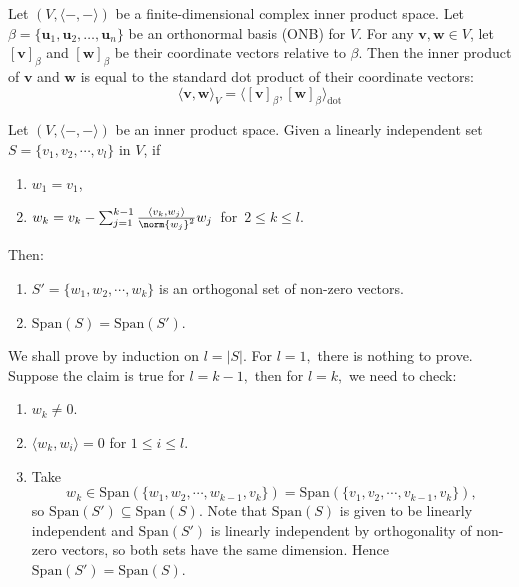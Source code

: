 \begin{theorem}
    Let $(V,\langle-,-\rangle)$ be a finite-dimensional complex inner product space. Let $\beta = \{\mathbf{u}_1, \mathbf{u}_2, \dots, \mathbf{u}_n\}$ be an orthonormal basis (ONB) for $V$. For any $\mathbf{v}, \mathbf{w} \in V$, let $[\mathbf{v}]_\beta$ and $[\mathbf{w}]_\beta$ be their coordinate vectors relative to $\beta$. Then the inner product of $\mathbf{v}$ and $\mathbf{w}$ is equal to the standard dot product of their coordinate vectors:
    $$ \langle \mathbf{v}, \mathbf{w} \rangle_V = \langle [\mathbf{v}]_\beta, [\mathbf{w}]_\beta \rangle_{\mathrm{dot}} $$
    \label{coordinate dot product}
\end{theorem}

\begin{theorem}
    Let $(V,\langle-,-\rangle)$ be an inner product space. Given a linearly independent set $S=\{v_1,v_2,\cdots,v_l\}$ in $V$, if
    \begin{enumerate}
        \item $w_1=v_1$,
        \item $w_k=v_k-\sum_{j=1}^{k-1}\frac{\langle v_k, w_j\rangle}{\norm{w_j}^2}w_j\,$ for $\,2\le k\le l.$
    \end{enumerate} 
    Then:
    \begin{enumerate}
        \item $S'=\{w_1,w_2,\cdots,w_k\}$ is an orthogonal set of non-zero vectors.
        \item $\mathrm{Span}(S)=\mathrm{Span}(S').$
    \end{enumerate}
\end{theorem}

\begin{pfbox}
    We shall prove by induction on $l=|S|.$
    For $l=1,$ there is nothing to prove. Suppose the claim is true for $l=k-1,$ then for $l=k,$
    we need to check:
    \begin{enumerate}
        \item $w_k\neq 0.$
        \item $\langle w_k, w_i\rangle=0$ for $1\le i\le l$.
        \item Take 
        $$w_k\in\mathrm{Span}(\{w_1,w_2,\cdots,w_{k-1},v_{k}\})=\mathrm{Span}(\{v_1,v_2,\cdots,v_{k-1},v_{k}\}),$$ 
        so $\mathrm{Span}(S')\subseteq\mathrm{Span}(S).$
        Note that $\mathrm{Span}(S)$ is given to be linearly independent and $\mathrm{Span}(S')$ is linearly independent by orthogonality of non-zero vectors, so both sets have the same dimension. Hence $\mathrm{Span}(S')=\mathrm{Span}(S).$
    \end{enumerate}
\end{pfbox}

